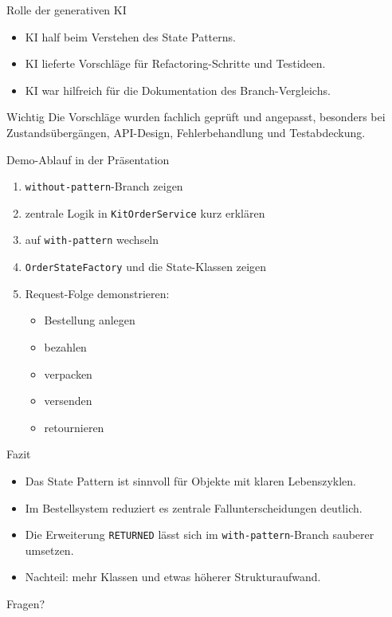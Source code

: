\documentclass[aspectratio=169]{beamer}
\begin{document}
\begin{frame}{Rolle der generativen KI}
  \begin{itemize}
    \item KI half beim Verstehen des State Patterns.
    \item KI lieferte Vorschläge für Refactoring-Schritte und Testideen.
    \item KI war hilfreich für die Dokumentation des Branch-Vergleichs.
  \end{itemize}
  \vspace{0.3cm}
  \begin{block}{Wichtig}
    Die Vorschläge wurden fachlich geprüft und angepasst, besonders bei Zustandsübergängen, API-Design, Fehlerbehandlung und Testabdeckung.
  \end{block}
\end{frame}

\begin{frame}{Demo-Ablauf in der Präsentation}
  \small
  \begin{enumerate}
    \item \texttt{without-pattern}-Branch zeigen
    \item zentrale Logik in \texttt{KitOrderService} kurz erklären
    \item auf \texttt{with-pattern} wechseln
    \item \texttt{OrderStateFactory} und die State-Klassen zeigen
    \item Request-Folge demonstrieren:
    \begin{itemize}
      \item Bestellung anlegen
      \item bezahlen
      \item verpacken
      \item versenden
      \item retournieren
    \end{itemize}
  \end{enumerate}
\end{frame}

\begin{frame}{Fazit}
  \begin{itemize}
    \item Das State Pattern ist sinnvoll für Objekte mit klaren Lebenszyklen.
    \item Im Bestellsystem reduziert es zentrale Fallunterscheidungen deutlich.
    \item Die Erweiterung \texttt{RETURNED} lässt sich im \texttt{with-pattern}-Branch sauberer umsetzen.
    \item Nachteil: mehr Klassen und etwas höherer Strukturaufwand.
  \end{itemize}
  \vspace{0.5cm}
  \centering
  \Large Fragen?
\end{frame}
\end{document}
